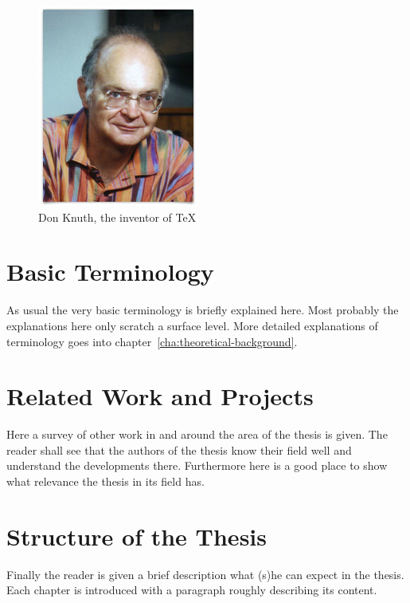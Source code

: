 \begin{figure}
\begin{center}
	\includegraphics[scale=.5]{images/don_knuth.jpg}
\end{center}
	\caption{Don Knuth, the inventor of \TeX}
	\label{fig:sample}
\end{figure}

\section{Basic Terminology}
As usual the very basic terminology is briefly explained here. Most probably the explanations here only scratch a surface level. More detailed explanations of terminology goes into chapter~\ref{cha:theoretical-background}.

\section{Related Work and Projects}
Here a survey of other work in and around the area of the thesis is given. The reader shall see that the authors of the thesis know their field well and understand the developments there. Furthermore here is a good place to show what relevance the thesis in its field has.

\section{Structure of the Thesis}
Finally the reader is given a brief description what (s)he can expect in the thesis. Each chapter is introduced with a paragraph roughly describing its content.